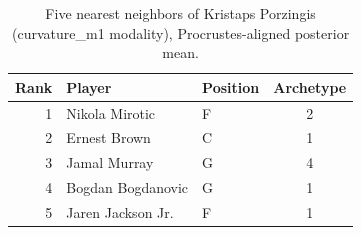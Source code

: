 \begin{table}[htbp]
  \centering\small
  \begin{tabular}{rllc}
    \toprule
    Rank & Player & Position & Archetype \\
    \midrule
    1 & Nikola Mirotic & F & 2 \\
    2 & Ernest Brown & C & 1 \\
    3 & Jamal Murray & G & 4 \\
    4 & Bogdan Bogdanovic & G & 1 \\
    5 & Jaren Jackson Jr. & F & 1 \\
    \bottomrule
  \end{tabular}
  \caption{Five nearest neighbors of Kristaps Porzingis (curvature_m1 modality), Procrustes-aligned posterior mean.}
  \label{tab:Kristaps_Porzingis_neighbors_curvature_m1}
\end{table}

